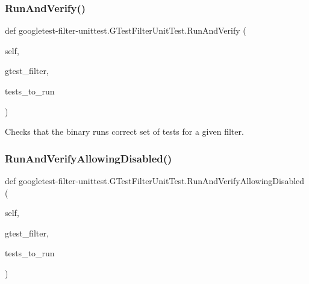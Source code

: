\subsubsection{\texorpdfstring{Run\+And\+Verify()}{RunAndVerify()}}
{\footnotesize\ttfamily def googletest-\/filter-\/unittest.\+G\+Test\+Filter\+Unit\+Test.\+Run\+And\+Verify (\begin{DoxyParamCaption}\item[{}]{self,  }\item[{}]{gtest\+\_\+filter,  }\item[{}]{tests\+\_\+to\+\_\+run }\end{DoxyParamCaption})}

\begin{DoxyVerb}Checks that the binary runs correct set of tests for a given filter.\end{DoxyVerb}
 \mbox{\label{classgoogletest-filter-unittest_1_1GTestFilterUnitTest_ad4202582f4fbc27a7e4ff9e751b1046f}} 
\subsubsection{\texorpdfstring{Run\+And\+Verify\+Allowing\+Disabled()}{RunAndVerifyAllowingDisabled()}}
{\footnotesize\ttfamily def googletest-\/filter-\/unittest.\+G\+Test\+Filter\+Unit\+Test.\+Run\+And\+Verify\+Allowing\+Disabled (\begin{DoxyParamCaption}\item[{}]{self,  }\item[{}]{gtest\+\_\+filter,  }\item[{}]{tests\+\_\+to\+\_\+run }\end{DoxyParamCaption})}

